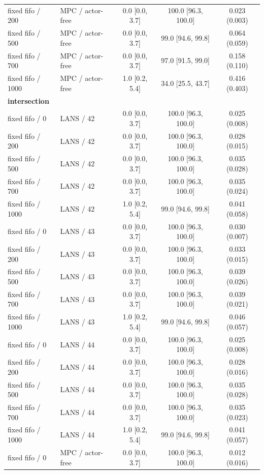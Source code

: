 \begin{longtable}{llccc}
fixed fifo / 200 & MPC / actor-free & 0.0 [0.0, 3.7] & 100.0 [96.3, 100.0] & 0.023 (0.003) \\
fixed fifo / 500 & MPC / actor-free & 0.0 [0.0, 3.7] & 99.0 [94.6, 99.8] & 0.064 (0.059) \\
fixed fifo / 700 & MPC / actor-free & 0.0 [0.0, 3.7] & 97.0 [91.5, 99.0] & 0.158 (0.110) \\
fixed fifo / 1000 & MPC / actor-free & 1.0 [0.2, 5.4] & 34.0 [25.5, 43.7] & 0.416 (0.403) \\
\multicolumn{5}{l}{\textbf{intersection}} \\
fixed fifo / 0 & LANS / 42 & 0.0 [0.0, 3.7] & 100.0 [96.3, 100.0] & 0.025 (0.008) \\
fixed fifo / 200 & LANS / 42 & 0.0 [0.0, 3.7] & 100.0 [96.3, 100.0] & 0.028 (0.015) \\
fixed fifo / 500 & LANS / 42 & 0.0 [0.0, 3.7] & 100.0 [96.3, 100.0] & 0.035 (0.028) \\
fixed fifo / 700 & LANS / 42 & 0.0 [0.0, 3.7] & 100.0 [96.3, 100.0] & 0.035 (0.024) \\
fixed fifo / 1000 & LANS / 42 & 1.0 [0.2, 5.4] & 99.0 [94.6, 99.8] & 0.041 (0.058) \\
fixed fifo / 0 & LANS / 43 & 0.0 [0.0, 3.7] & 100.0 [96.3, 100.0] & 0.030 (0.007) \\
fixed fifo / 200 & LANS / 43 & 0.0 [0.0, 3.7] & 100.0 [96.3, 100.0] & 0.033 (0.015) \\
fixed fifo / 500 & LANS / 43 & 0.0 [0.0, 3.7] & 100.0 [96.3, 100.0] & 0.039 (0.026) \\
fixed fifo / 700 & LANS / 43 & 0.0 [0.0, 3.7] & 100.0 [96.3, 100.0] & 0.039 (0.021) \\
fixed fifo / 1000 & LANS / 43 & 1.0 [0.2, 5.4] & 99.0 [94.6, 99.8] & 0.046 (0.057) \\
fixed fifo / 0 & LANS / 44 & 0.0 [0.0, 3.7] & 100.0 [96.3, 100.0] & 0.025 (0.008) \\
fixed fifo / 200 & LANS / 44 & 0.0 [0.0, 3.7] & 100.0 [96.3, 100.0] & 0.028 (0.016) \\
fixed fifo / 500 & LANS / 44 & 0.0 [0.0, 3.7] & 100.0 [96.3, 100.0] & 0.035 (0.028) \\
fixed fifo / 700 & LANS / 44 & 0.0 [0.0, 3.7] & 100.0 [96.3, 100.0] & 0.035 (0.023) \\
fixed fifo / 1000 & LANS / 44 & 1.0 [0.2, 5.4] & 99.0 [94.6, 99.8] & 0.041 (0.057) \\
fixed fifo / 0 & MPC / actor-free & 0.0 [0.0, 3.7] & 100.0 [96.3, 100.0] & 0.012 (0.016) \\

\end{longtable}

